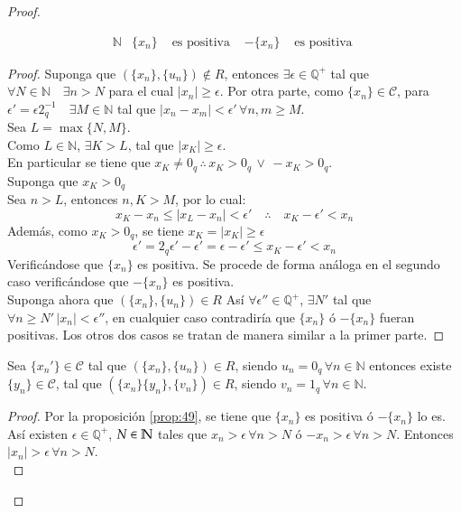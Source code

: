 \begin{proof}
\begin{proposition}{\label{prop:49}}
\begin{align*}
    \mathbb{N} & \{x_n\} &\mbox{ es positiva } & -\{x_n\} &\mbox{ es positiva
    }
  \end{align*}
\end{proposition}
\begin{proof}
  Suponga que $(\{x_n\}, \{u_n\}) \notin R$, entonces $\exists \epsilon \in
  \mathbb{Q}^+$ tal que $\forall N \in \mathbb{N} \quad \exists n > N$ para el
  cual $|x_n| \geq \epsilon$. Por otra parte, como $\{x_n \} \in \mathcal{C}$,
  para $\epsilon' = \epsilon 2_q^{-1} \quad \exists M \in \mathbb{N}$ tal que
  $|x_n-x_m|< \epsilon' \, \forall n,m \geq M$. \\
  Sea $L = \max \{N, M\}$.\\
  Como $L\in \mathbb{N}$, $\exists K > L$, tal que $|x_K| \geq \epsilon$.\\
  En particular se tiene que $x_K \neq 0_q \, \therefore \, x_K > 0_q \, \lor
  \, -x_K > 0_q$. \\
  Suponga que $x_K > 0_q$\\
  Sea $n >L$, entonces $n, K >M$, por lo cual:
  \[
    x_K-x_n \leq |x_L-x_n| < \epsilon' \quad \therefore \quad x_K -\epsilon'
    <x_n
  \]
  Además, como $x_K> 0_q $, se tiene $x_K= |x_K| \geq \epsilon$ 
  \[
    \epsilon' = 2_q\epsilon' - \epsilon' = \epsilon - \epsilon' \leq x_K -
    \epsilon' < x_n
  \]
  Verificándose que $\{x_n\}$ es positiva.
  Se procede de forma análoga en el segundo caso verificándose que $-\{x_n\}$
  es positiva. \\
  Suponga ahora que $(\{x_n\}, \{u_n\}) \in R$ Así $\forall \epsilon'' \in
  \mathbb{Q}^+$, $\exists N'$ tal que $\forall n \geq N' \, |x_n| <
  \epsilon''$, en cualquier caso contradiría que $\{x_n\}$ ó $-\{x_n\}$ fueran
  positivas. Los otros dos casos se tratan de manera similar a la primer
  parte.
\end{proof}
\begin{proposition}\label{prop:50}
  Sea $\{x_n'\} \in \mathcal{C}$ tal que $(\{x_n\}, \{u_n\})\in R$, siendo
  $u_n= 0_q \, \forall n \in \mathbb{N}$ entonces existe
  $\{y_n\} \in \mathcal{C}$, tal que $(\{x_n\}\{y_n\}, \{v_n\}) \in R$, siendo
  $v_n = 1_q \, \forall n \in \mathbb{N}$.
\end{proposition}
\begin{proof}
  Por la proposición \ref{prop:49}, se tiene que $\{x_n\}$ es positiva ó $-
  \{x_n\}$ lo es. Así existen $\epsilon \in \mathbb{Q}^+$, $N \in \Bbb{N}$ tales
  que $x_n > \epsilon \, \forall n > N$ ó  $- x_n > \epsilon \, \forall n > N$.
  Entonces $|x_n| > \epsilon \, \forall n > N$. \\

\end{proof}
\end{proof}

